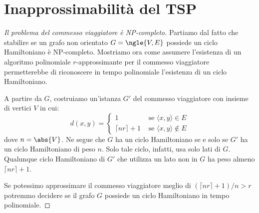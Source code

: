 \documentclass[\main/main.tex]{subfiles}
\begin{document}
\section{Inapprossimabilità del TSP}
\begin{proof}[Il problema del commesso viaggiatore è NP-completo]
    Partiamo dal fatto che stabilire se un grafo non orientato \(G = \ngle{V, E}\) possiede un ciclo Hamiltoniano è NP-completo. Mostriamo ora come assumere l'esistenza di un algoritmo polinomiale \(r\)-approssimante per il commesso viaggiatore permetterebbe di riconoscere in tempo polinomiale l'esistenza di un ciclo Hamiltoniano.
    
    A partire da \(G\), costruiamo un'istanza \(G'\) del commesso viaggiatore con insieme di vertici \(V\) in cui:
    \[
        d(x, y)=\left\{\begin{array}{ll}{1} & {\text { se }\langle x, y\rangle \in E} \\ {\lceil n r\rceil+ 1} & {\text { se }\langle x, y\rangle \notin E}\end{array}\right.
    \]
    dove \(n = \abs{V}\). Ne segue che \(G\) ha un ciclo Hamiltoniano se e solo se \(G'\) ha un ciclo Hamiltoniano di peso \(n\). Solo tale ciclo, infatti, usa solo lati di \(G\). Qualunque ciclo Hamiltoniano di \(G'\) che utilizza un lato non in \(G\) ha peso almeno \(\lceil n r\rceil+ 1\).
    
    Se potessimo approssimare il commesso viaggiatore meglio di \((\lceil n r\rceil+ 1) / n>r\) potremmo decidere se il grafo \(G\) possiede un ciclo Hamiltoniano in tempo polinomiale.
\end{proof}
\clearpage
\end{document}
